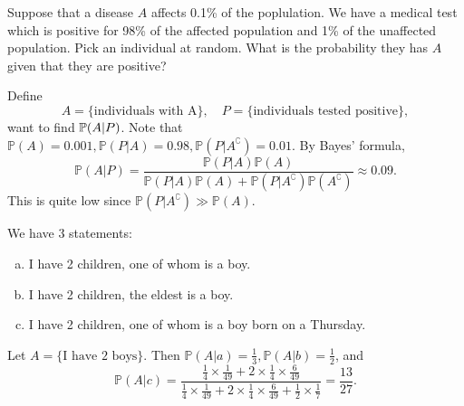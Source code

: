\begin{example}
    Suppose that a disease $A$ affects 0.1\% of the poplulation. We have a medical test which is positive for 98\% of the affected population and 1\% of the unaffected population. Pick an individual at random. What is the probability they has $A$ given that they are positive?

    Define 
    \[
        A = \{\text{individuals with A}\},\quad P=\{\text{individuals tested positive}\},
    \]
    want to find ${\mathbb{P}}(A|P)$. Note that $ \mathbb{P}(A)=0.001, \mathbb{P}(P|A) = 0.98, \mathbb{P}(P|A^\complement)=0.01 $. By Bayes' formula,
    \[
        \mathbb{P}(A|P) = \frac{\mathbb{P}(P|A)\mathbb{P}(A)}{\mathbb{P}(P|A)\mathbb{P}(A)+\mathbb{P}(P|A^\complement)\mathbb{P}(A^\complement)} \approx 0.09.
    \]
    This is quite low since $ \mathbb{P}(P|A^\complement)\gg \mathbb{P}(A) $.
\end{example}
\begin{example}
    We have 3 statements:
    \begin{enumerate}[(a).]
        \item I have 2 children, one of whom is a boy.
        \item I have 2 children, the eldest is a boy.
        \item I have 2 children, one of whom is a boy born on a Thursday.
    \end{enumerate}
    Let $ A = \{\text{I have 2 boys}\} $. Then $\mathbb{P}(A|a) = \frac{1}{3},\mathbb{P}(A|b) = \frac{1}{2}$, and 
    \[
        \mathbb{P}(A|c) = \frac{\frac{1}{4}\times \frac{1}{49}+2 \times \frac{1}{4}\times \frac{6}{49}}{\frac{1}{4}\times \frac{1}{49}+2 \times \frac{1}{4}\times \frac{6}{49}+\frac{1}{2}\times \frac{1}{7}} = \frac{13}{27}.
    \]
\end{example}

